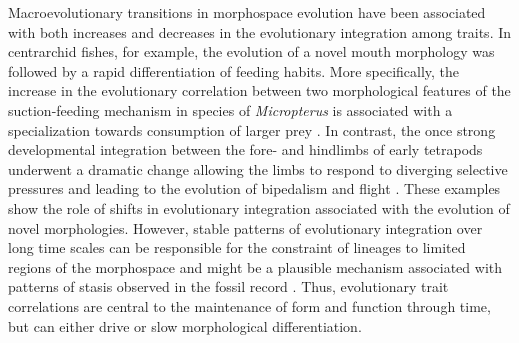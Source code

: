 Macroevolutionary transitions in morphospace evolution have been associated with both increases and decreases in the evolutionary integration among traits. In centrarchid fishes, for example, the evolution of a novel mouth morphology was followed by a rapid differentiation of feeding habits. More specifically, the increase in the evolutionary correlation between two morphological features of the suction-feeding mechanism in species of \textit{Micropterus} is associated with a specialization towards consumption of larger prey \citep{collar_comparative_2005, revell_phylogenetic_2009}. In contrast, the once strong developmental integration between the fore- and hindlimbs of early tetrapods underwent a dramatic change allowing the limbs to respond to diverging selective pressures and leading to the evolution of bipedalism and flight \citep{young_serial_2005, young_development_2010, dececchi_body_2013}. These examples show the role of shifts in evolutionary integration associated with the evolution of novel morphologies. However, stable patterns of evolutionary integration over long time scales can be responsible for the constraint of lineages to limited regions of the morphospace and might be a plausible mechanism associated with patterns of stasis observed in the fossil record \citep{pigliucci_evolvability_2004, bolstad_genetic_2014, goswami_fossil_2015}. Thus, evolutionary trait correlations are central to the maintenance of form and function through time, but can either drive or slow morphological differentiation.

